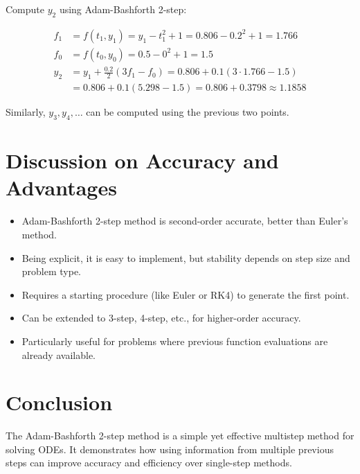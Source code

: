 \documentclass[11pt,a4paper]{article}
\begin{document}
Compute $y_2$ using Adam-Bashforth 2-step:

\[
\begin{aligned}
f_1 &= f(t_1, y_1) = y_1 - t_1^2 + 1 = 0.806 - 0.2^2 + 1 = 1.766 \\
f_0 &= f(t_0, y_0) = 0.5 - 0^2 + 1 = 1.5 \\
y_2 &= y_1 + \frac{0.2}{2} (3 f_1 - f_0) = 0.806 + 0.1 (3 \cdot 1.766 - 1.5) \\
&= 0.806 + 0.1 (5.298 - 1.5) = 0.806 + 0.3798 \approx 1.1858
\end{aligned}
\]

Similarly, $y_3, y_4, \dots$ can be computed using the previous two points.

\section{Discussion on Accuracy and Advantages}
\begin{itemize}
    \item Adam-Bashforth 2-step method is second-order accurate, better than Euler’s method.  
    \item Being explicit, it is easy to implement, but stability depends on step size and problem type.  
    \item Requires a starting procedure (like Euler or RK4) to generate the first point.  
    \item Can be extended to 3-step, 4-step, etc., for higher-order accuracy.  
    \item Particularly useful for problems where previous function evaluations are already available.
\end{itemize}

\section{Conclusion}
The Adam-Bashforth 2-step method is a simple yet effective multistep method for solving ODEs. It demonstrates how using information from multiple previous steps can improve accuracy and efficiency over single-step methods.
\end{document}
